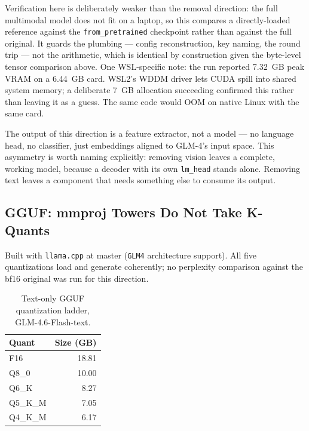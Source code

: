 \documentclass[11pt]{article}
\begin{document}
Verification here is deliberately weaker than the removal direction: the full
multimodal model does not fit on a laptop, so this compares a directly-loaded reference
against the \texttt{from\_pretrained} checkpoint rather than against the full original.
It guards the plumbing --- config reconstruction, key naming, the round trip --- not the
arithmetic, which is identical by construction given the byte-level tensor comparison
above. One WSL-specific note: the run reported 7.32~GB peak VRAM on a 6.44~GB card.
WSL2's WDDM driver lets CUDA spill into shared system memory; a deliberate 7~GB
allocation succeeding confirmed this rather than leaving it as a guess. The same code
would OOM on native Linux with the same card.

The output of this direction is a feature extractor, not a model --- no language head, no
classifier, just embeddings aligned to GLM-4's input space. This asymmetry is worth
naming explicitly: removing vision leaves a complete, working model, because a decoder
with its own \texttt{lm\_head} stands alone. Removing text leaves a component that needs
something else to consume its output.

\subsection{GGUF: mmproj Towers Do Not Take K-Quants}

Built with \texttt{llama.cpp} at master (\texttt{GLM4} architecture support). All five
quantizations load and generate coherently; no perplexity comparison against the bf16
original was run for this direction.

\begin{table}[h]
\centering
\small
\begin{tabular}{lr}
\toprule
Quant & Size (GB) \\
\midrule
F16 & 18.81 \\
Q8\_0 & 10.00 \\
Q6\_K & 8.27 \\
Q5\_K\_M & 7.05 \\
Q4\_K\_M & 6.17 \\
\bottomrule
\end{tabular}
\caption{Text-only GGUF quantization ladder, GLM-4.6-Flash-text.}
\end{table}
\end{document}

